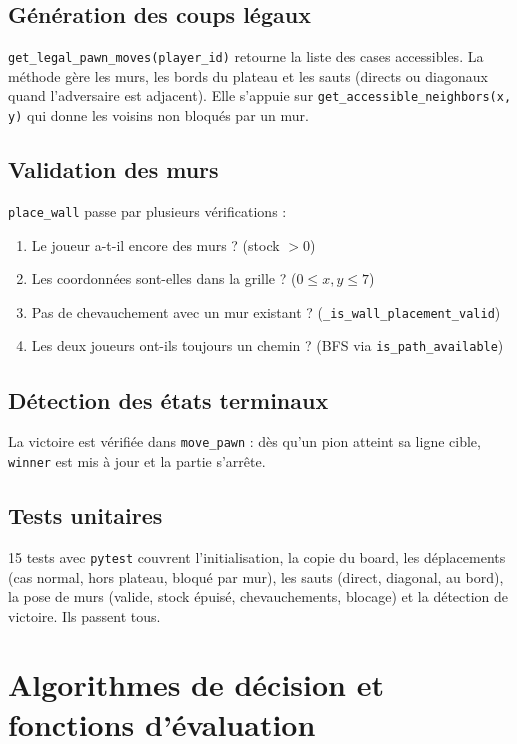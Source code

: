 \documentclass[a4paper, 12pt]{report}
\begin{document}
\subsection{Génération des coups légaux}

\texttt{get\_legal\_pawn\_moves(player\_id)} retourne la liste des cases accessibles. La méthode gère les murs, les bords du plateau et les sauts (directs ou diagonaux quand l'adversaire est adjacent). Elle s'appuie sur \texttt{get\_accessible\_neighbors(x, y)} qui donne les voisins non bloqués par un mur.

\subsection{Validation des murs}

\texttt{place\_wall} passe par plusieurs vérifications :
\begin{enumerate}
    \item Le joueur a-t-il encore des murs ? (stock $> 0$)
    \item Les coordonnées sont-elles dans la grille ? ($0 \leq x, y \leq 7$)
    \item Pas de chevauchement avec un mur existant ? (\texttt{\_is\_wall\_placement\_valid})
    \item Les deux joueurs ont-ils toujours un chemin ? (BFS via \texttt{is\_path\_available})
\end{enumerate}

\subsection{Détection des états terminaux}

La victoire est vérifiée dans \texttt{move\_pawn} : dès qu'un pion atteint sa ligne cible, \texttt{winner} est mis à jour et la partie s'arrête.

\subsection{Tests unitaires}

15 tests avec \texttt{pytest} couvrent l'initialisation, la copie du board, les déplacements (cas normal, hors plateau, bloqué par mur), les sauts (direct, diagonal, au bord), la pose de murs (valide, stock épuisé, chevauchements, blocage) et la détection de victoire. Ils passent tous.

\section{Algorithmes de décision et fonctions d'évaluation}
\end{document}
